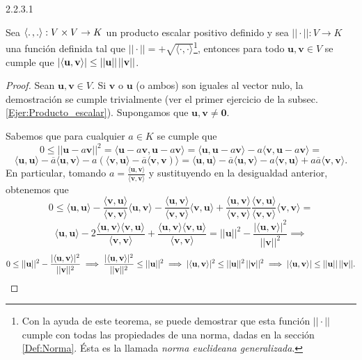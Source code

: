 \documentclass[notasLineal]{subfile}
\begin{document}
\begin{Teo} {2.2.3.1} 

    Sea $\langle.\hspace{0.5mm},.\rangle:V\times V\rightarrow K$ un producto escalar positivo definido y sea $||\cdot ||:V\rightarrow K$ una función definida tal que $||\cdot||=+\sqrt{\langle\cdot,\cdot\rangle}$\footnote{Con la ayuda de este teorema, se puede demostrar que esta función $||\cdot ||$ cumple con todas las propiedades de una norma, dadas en la sección \ref{Def:Norma}. Ésta es la llamada \emph{norma euclideana generalizada}.}, entonces para todo $\mathbf{u},\mathbf{v}\in V$ se cumple que $|\langle\mathbf{u},\mathbf{v}\rangle|\leq ||\mathbf{u}||\hspace{0.5mm}||\mathbf{v}||$.

\begin{proof}
    Sean $\mathbf{u},\mathbf{v}\in V.$ Si $\mathbf{v}$ o $\mathbf{u}$ (o ambos) son iguales al vector nulo, la demostración se cumple trivialmente (ver el primer ejercicio de la subsec. \ref{Ejer:Producto_escalar}). Supongamos que $\mathbf{u},\mathbf{v}\neq\mathbf{0}$. 

    Sabemos que para cualquier $a\in K$ se cumple que $$0\leq ||\mathbf{u}-a\mathbf{v}||^2 = \langle\mathbf{u}-a\mathbf{v},\mathbf{u}-a\mathbf{v}\rangle= \langle\mathbf{u},\mathbf{u}-a\mathbf{v}\rangle-a\langle\mathbf{v},\mathbf{u}-a\mathbf{v}\rangle=$$ $$\langle\mathbf{u},\mathbf{u}\rangle-\overline{a}\langle\mathbf{u},\mathbf{v}\rangle-a(\langle\mathbf{v},\mathbf{u}\rangle-\overline{a}\langle\mathbf{v},\mathbf{v})\rangle=\langle\mathbf{u},\mathbf{u}\rangle-\overline{a}\langle\mathbf{u},\mathbf{v}\rangle-a\langle\mathbf{v},\mathbf{u}\rangle+a\overline{a}\langle\mathbf{v},\mathbf{v}\rangle.$$ \noindent En particular, tomando $a=\frac{\langle\mathbf{u},\mathbf{v}\rangle}{\langle\mathbf{v},\mathbf{v}\rangle}$ y sustituyendo en la desigualdad anterior, obtenemos que $$0\leq\langle\mathbf{u},\mathbf{u}\rangle-\frac{\langle\mathbf{v},\mathbf{u}\rangle}{\langle\mathbf{v},\mathbf{v}\rangle}\langle\mathbf{u},\mathbf{v}\rangle-\frac{\langle\mathbf{u},\mathbf{v}\rangle}{\langle\mathbf{v},\mathbf{v}\rangle}\langle\mathbf{v},\mathbf{u}\rangle+\frac{\langle\mathbf{u},\mathbf{v}\rangle}{\langle\mathbf{v},\mathbf{v}\rangle}\frac{\langle\mathbf{v},\mathbf{u}\rangle}{\langle\mathbf{v},\mathbf{v}\rangle}\langle\mathbf{v},\mathbf{v}\rangle=$$ $$\langle\mathbf{u},\mathbf{u}\rangle-2\frac{\langle\mathbf{u},\mathbf{v}\rangle\langle\mathbf{v},\mathbf{u}\rangle}{\langle\mathbf{v},\mathbf{v}\rangle}+\frac{\langle\mathbf{u},\mathbf{v}\rangle\langle\mathbf{v},\mathbf{u}\rangle}{\langle\mathbf{v},\mathbf{v}\rangle}=||\mathbf{u}||^2-\frac{|\langle\mathbf{u},\mathbf{v}\rangle|^2}{||\mathbf{v}||^2}\implies$$ $$0\leq ||\mathbf{u}||^2-\frac{|\langle\mathbf{u},\mathbf{v}\rangle|^2}{||\mathbf{v}||^2}\implies \frac{|\langle\mathbf{u},\mathbf{v}\rangle|^2}{||\mathbf{v}||^2}\leq ||\mathbf{u}||^2\implies|\langle\mathbf{u},\mathbf{v}\rangle|^2\leq ||\mathbf{u}||^2\hspace{0.5mm}||\mathbf{v}||^2\implies|\langle\mathbf{u},\mathbf{v}\rangle|\leq ||\mathbf{u}||\hspace{0.5mm}||\mathbf{v}||.$$


\end{proof}
\end{Teo}
\end{document}
